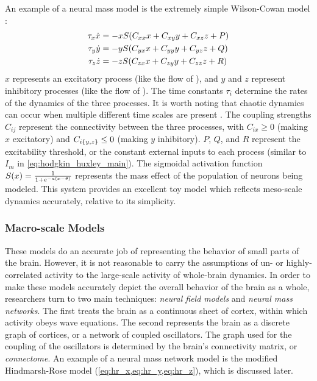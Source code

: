 An example of a neural mass model is the extremely simple Wilson-Cowan model \cite{Wang2012}:
\begin{align}
  \label{eq:wc_x}
  \tau_{x} \dot{x}
  &=
    -x S \pqty{C_{x x} x + C_{x y} y + C_{x z} z + P} \\
  \label{eq:wc_y}
  \tau_{y} \dot{y}
  &=
    -y S \pqty{C_{y x} x + C_{y y} y + C_{y z} z + Q} \\
  \label{eq:wc_z}
  \tau_{z} \dot{z}
  &=
    -z S \pqty{C_{z x} x + C_{z y} y + C_{z z} z + R}
\end{align}
$x$ represents an excitatory process (like the flow of ), and $y$ and $z$ represent inhibitory processes (like the flow of ).
The time constants $\tau_{i}$ determine the rates of the dynamics of the three processes.
It is worth noting that chaotic dynamics can occur when multiple different time scales are present \cite{Breakspear2017}.
The coupling strengths $C_{i j}$ represent the connectivity between the three processes, with $C_{i x} \geq 0$ (making $x$ excitatory) and $C_{i \Bqty{y, z}} \leq 0$ (making $y$ inhibitory).
$P$, $Q$, and $R$ represent the excitability threshold, or the constant external inputs to each process (similar to $I_{m}$ in \cref{eq:hodgkin_huxley_main}).
The sigmoidal activation function $S(x) = \frac{1}{1 + e^{-a \pqty{x - \theta}}}$ represents the mass effect of the population of neurons being modeled.
This system provides an excellent toy model which reflects meso-scale dynamics accurately, relative to its simplicity.

\subsubsection{Macro-scale Models}
\label{sec:intro_seizures_neuroanatomy_macro_scale}
These models do an accurate job of representing the behavior of small parts of the brain.
However, it is not reasonable to carry the assumptions of un- or highly-correlated activity to the large-scale activity of whole-brain dynamics.
In order to make these models accurately depict the overall behavior of the brain as a whole, researchers turn to two main techniques: \textit{neural field models} and \textit{neural mass networks}.
The first treats the brain as a continuous sheet of cortex, within which activity obeys wave equations.
The second represents the brain as a discrete graph of cortices, or a network of coupled oscillators.
The graph used for the coupling of the oscillators is determined by the brain's connectivity matrix, or \textit{connectome}.
An example of a neural mass network model is the modified Hindmarsh-Rose model (\cref{eq:hr_x,eq:hr_y,eq:hr_z}), which is discussed later.

